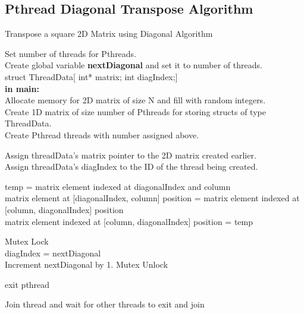 \documentclass[10pt, onecolumn]{article}
\begin{document}
\subsection{Pthread Diagonal Transpose Algorithm}
%
\begin{algorithm}[H]
    \label{Alg:PthreadDiagonalTrans}
    \caption{Transpose a square 2D Matrix using Diagonal Algorithm}
    Set number of threads for Pthreads.\\
    Create global variable \textbf{nextDiagonal} and set it to number of threads. \\
    struct ThreadData[ int* matrix; int diagIndex;] \\
    
    \textbf{in main:} \\
    Allocate memory for 2D matrix of size N and fill with random integers. \\
    Create 1D matrix of size number of Pthreads for storing structs of type ThreadData. \\
    Create Pthread threads with number assigned above.\\
    
    {   
        Assign threadData's matrix pointer to the 2D matrix created earlier.\\
        Assign threadData's diagIndex to the ID of the thread being created.\\
        {
            {
                temp = matrix element indexed at diagonalIndex and column \\
                matrix element at [diagonalIndex, column] position = matrix element indexed at [column,  diagonalIndex] position \\
                matrix element indexed at [column, diagonalIndex] position = temp
            }
            
            Mutex Lock\\
            {
                diagIndex = nextDiagonal\\
                Increment nextDiagonal by 1.
                }
            Mutex Unlock\\
            
        }
        exit pthread
    }
    
    {
        Join thread and wait for other threads to exit and join
    }
\end{algorithm}
%
\clearpage
\end{document}
